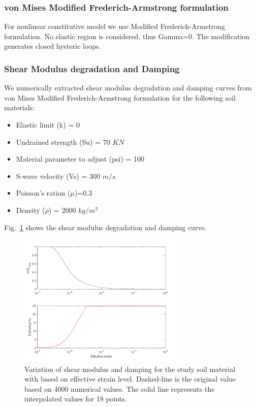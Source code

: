 \subsubsection{von Mises Modified Frederich-Armstrong formulation}

For nonlinear constitutive model we use Modified Frederich-Armstrong formulation. No elastic region is considered, thus Gamma=0. The modification generates closed hysteric loops.

\subsubsection{Shear Modulus degradation and Damping}

We numerically extracted shear modulus degradation and damping curves from von Mises Modified Frederich-Armstrong formulation for the following soil materials:

\begin{itemize}
\item Elastic limit (k) = 0
\item Undrained strength (Su) = 70 $KN$
\item Material parameter to adjust (psi) = 100
\item S-wave velocity (Vs) = 300 $m/s$
\item Poisson's ration ($\mu$)=0.3
\item Density ($\rho$) = 2000 $kg/m^3$
\end{itemize}

Fig.~\ref{fig:GD_18_points_FAM_su70kn_psi100_vs300} shows the shear modulus degradation and damping curve. 

 \begin{figure}[H]
    \centering
    \includegraphics[width=300px]{figures/pdf/GD_18_points_FAM_su70kn_psi100_vs300.pdf}
    \caption{Variation of shear modulus and damping for the study soil material with based on effective strain level. Dashed-line is the original value based on 4000 numerical values. The solid line represents the interpolated values for 18 points.}
    \label{fig:GD_18_points_FAM_su70kn_psi100_vs300}
\end{figure}




